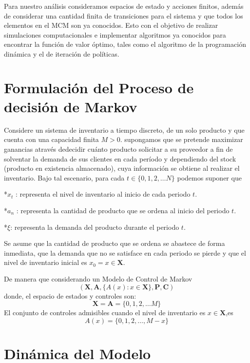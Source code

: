 \documentclass[
  letterpaper,
  DIV=11,
  numbers=noendperiod]{scrreprt}
\begin{document}
Para nuestro análisis consideramos espacios de estado y acciones
finitos, además de considerar una cantidad finita de transiciones para
el sistema y que todos los elementos en el MCM son ya conocidos. Esto
con el objetivo de realizar simulaciones computacionales e implementar
algoritmos ya conocidos para encontrar la función de valor óptimo, tales
como el algoritmo de la programación dinámica y el de iteración de
políticas.


\chapter{Formulación del Proceso de decisión de
Markov}\label{formulaciuxf3n-del-proceso-de-decisiuxf3n-de-markov}

Considere un sistema de inventario a tiempo discreto, de un solo
producto y que cuenta con una capacidad finita \(M>0\). supongamos que
se pretende maximizar ganancias através dedecidir cuánto producto
solicitar a su proveedor a fin de solventar la demanda de sus clientes
en cada período y dependiendo del stock (producto en existencia
almacenado), cuya información se obtiene al realizar el inventario. Bajo
tal escenario, para cada \(t\in \{0,1,2, \dotso N\}\) podemos suponer
que

*\(x_t\) : representa el nivel de inventario al inicio de cada periodo
\(t\).

*\(a_n\) : representa la cantidad de producto que se ordena al inicio
del periodo \(t\).

*\(\xi\): representa la demanda del producto durante el periodo \(t\).

Se asume que la cantidad de producto que se ordena se abastece de forma
inmediata, que la demanda que no se satisface en cada periodo se pierde
y que el nivel de inventario inicial es \(x_0=x \in \mathbf{X}\).

De manera que considerando un Modelo de Control de Markov
\[( \mathbf{X}, \mathbf{A}, \{A(x): x \in \mathbf{X}\}, \mathbf{P},\mathbf{C})\]
donde, el espacio de estados y controles son:
\[\mathbf{X}=\mathbf{A}=\{0,1,2, \dotso M\}\] El conjunto de controles
admisibles cuando el nivel de inventario es \(x\in\mathbf{X}\),es
\[A(x)=\{0,1,2, \dotso,M-x\}\]


\chapter{Dinámica del Modelo}\label{dinuxe1mica-del-modelo}
\end{document}
